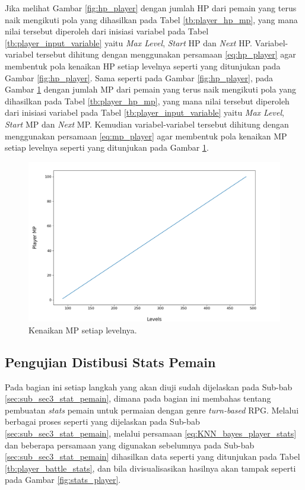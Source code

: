 Jika melihat Gambar \ref{fig:hp_player} dengan jumlah HP dari pemain yang terus naik mengikuti pola yang dihasilkan pada Tabel \ref{tb:player_hp_mp}, yang mana nilai tersebut diperoleh dari inisiasi variabel pada Tabel \ref{tb:player_input_variable} yaitu \textit{Max Level}, \textit{Start} HP dan \textit{Next} HP. Variabel-variabel tersebut dihitung dengan menggunakan persamaan \ref{eq:hp_player} agar membentuk pola kenaikan HP setiap levelnya seperti yang ditunjukan pada Gambar \ref{fig:hp_player}. Sama seperti pada Gambar \ref{fig:hp_player}, pada Gambar \ref{fig:mp_player} dengan jumlah MP dari pemain yang terus naik mengikuti pola yang dihasilkan pada Tabel \ref{tb:player_hp_mp}, yang mana nilai tersebut diperoleh dari inisiasi variabel pada Tabel \ref{tb:player_input_variable} yaitu \textit{Max Level}, \textit{Start} MP dan \textit{Next} MP. Kemudian variabel-variabel tersebut dihitung dengan menggunakan persamaan \ref{eq:mp_player} agar membentuk pola kenaikan MP setiap levelnya seperti yang ditunjukan pada Gambar \ref{fig:mp_player}.

\begin{figure} [!h] \centering
	\includegraphics[scale=0.45]{img/PlayerMpDistrib.png}
	\caption{Kenaikan MP setiap levelnya.}
	\label{fig:mp_player}
\end{figure}
\vspace{1ex}


\subsection{Pengujian Distibusi Stats Pemain}
\label{sec:sub_sec4_eval_player_stats}
\vspace{1ex}

Pada bagian ini setiap langkah yang akan diuji sudah dijelaskan pada Sub-bab \ref{sec:sub_sec3_stat_pemain}, dimana pada bagian ini membahas tentang pembuatan \textit{stats} pemain untuk permaian dengan genre \textit{turn-based} RPG. Melalui berbagai proses seperti yang dijelaskan pada Sub-bab \ref{sec:sub_sec3_stat_pemain}, melalui persamaan \ref{eq:KNN_bayes_player_stats} dan beberapa persamaan yang digunakan sebelumnya pada Sub-bab \ref{sec:sub_sec3_stat_pemain} dihasilkan data seperti yang ditunjukan pada Tabel \ref{tb:player_battle_stats}, dan bila divisualisasikan hasilnya akan tampak seperti pada Gambar \ref{fig:stats_player}.
\vspace{-1ex}

